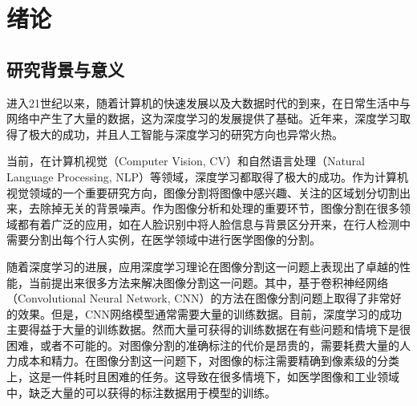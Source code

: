 \documentclass[AutoFakeBold]{LZUThesis}
\begin{document}









\setcounter{chapter}{0}

\chapter{绪论}
\section{研究背景与意义}
进入21世纪以来，随着计算机的快速发展以及大数据时代的到来，在日常生活中与网络中产生了大量的数据，这为深度学习的发展提供了基础。近年来，深度学习取得了极大的成功，并且人工智能与深度学习的研究方向也异常火热。

当前，在计算机视觉（Computer Vision, CV）和自然语言处理（Natural Language Processing, NLP）等领域，深度学习都取得了极大的成功。作为计算机视觉领域的一个重要研究方向，图像分割将图像中感兴趣、关注的区域划分切割出来，去除掉无关的背景噪声。作为图像分析和处理的重要环节，图像分割在很多领域都有着广泛的应用，如在人脸识别中将人脸信息与背景区分开来，在行人检测中需要分割出每个行人实例，在医学领域中进行医学图像的分割。

随着深度学习的进展，应用深度学习理论在图像分割这一问题上表现出了卓越的性能，当前提出来很多方法来解决图像分割这一问题。其中，基于卷积神经网络（Convolutional Neural Network, CNN）的方法在图像分割问题上取得了非常好的效果。但是，CNN网络模型通常需要大量的训练数据。目前，深度学习的成功主要得益于大量的训练数据。然而大量可获得的训练数据在有些问题和情境下是很困难，或者不可能的。对图像分割的准确标注的代价是昂贵的，需要耗费大量的人力成本和精力。在图像分割这一问题下，对图像的标注需要精确到像素级的分类上，这是一件耗时且困难的任务。这导致在很多情境下，如医学图像和工业领域中，缺乏大量的可以获得的标注数据用于模型的训练。
\end{document}
